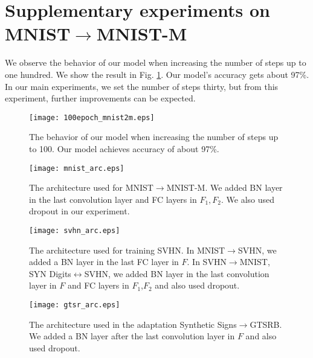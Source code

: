 \documentclass{article}
\begin{document}
\section*{Supplementary experiments on MNIST$\rightarrow$MNIST-M}
We observe the behavior of our model when increasing the number of steps up to one hundred. We show the result in Fig. \ref{fig:100epoch}. Our model's accuracy gets about 97\%. In our main experiments, we set the number of steps thirty, but from this experiment, further improvements can be expected.
\begin{figure}[t]
  \begin{center}
   \texttt{[image: 100epoch\_mnist2m.eps]}
  \end{center}
\caption{The behavior of our model when increasing the number of steps up to 100. Our model achieves accuracy of about 97\%.}
    \label{fig:100epoch}
\end{figure}

\begin{figure*}[t]
  \begin{center}
   \texttt{[image: mnist\_arc.eps]}
  \end{center}
\caption{The architecture used for MNIST$\rightarrow$MNIST-M. We added BN layer in the last convolution layer and FC layers in $F_{1},F_{2}$. We also used dropout in our experiment.}
    \label{fig:mnist_arc}
\end{figure*}

\begin{figure*}[t]
  \begin{center}
   \texttt{[image: svhn\_arc.eps]}
  \end{center}
\caption{The architecture used for training SVHN. In MNIST$\rightarrow$SVHN, we added a BN layer in the last FC layer in $F$. In SVHN$\rightarrow$MNIST, SYN Digits$\leftrightarrow$SVHN, we added BN layer in the last convolution layer in $F$ and FC layers in $F_{1}$,$F_{2}$ and also used dropout.}
    \label{fig:svhn_arc}
\end{figure*}

\begin{figure*}[t]
  \begin{center}
   \texttt{[image: gtsr\_arc.eps]}
  \end{center}
\caption{The architecture used in the adaptation Synthetic Signs$\rightarrow$GTSRB. We added a BN layer after the last convolution layer in $F$ and also used dropout.}
    \label{fig:gtsr_arc}
\end{figure*}
\end{document}
